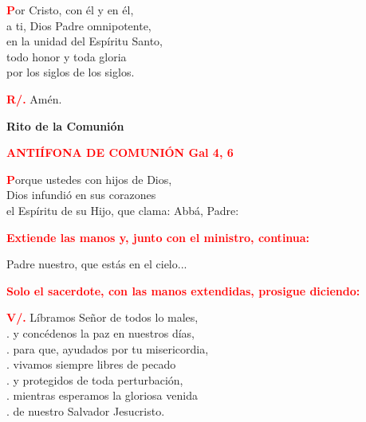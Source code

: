 \documentclass[12pt, letterpaper, spanish]{report}
\begin{document}
\lettrine[lines=1]{\bfseries \textcolor{red}{P}}{}or Cristo, con \'el y en \'el,\\
a ti, Dios Padre omnipotente,\\
en la unidad del Esp\'iritu Santo,\\
todo honor y toda gloria\\
por los siglos de los siglos.\newline

\Large \hspace{-0.9cm} {\bfseries \textcolor{red}{R/.}} \hspace{0.5cm} Am\'en.\newline

\begin{center}
\Huge {\bfseries Rito de la Comuni\'on}
\end{center}

\Large {\bfseries \textcolor{red}{ANTI\'IFONA DE COMUNI\'ON \hspace{2cm} \large Gal 4, 6}}

\Large \lettrine[lines=1]{\bfseries \textcolor{red}{P}}{}orque ustedes con hijos de Dios,\\
Dios infundi\'o en sus corazones\\
el Esp\'iritu de su Hijo, que clama: Abb\'a, Padre:\newline

\large{\bfseries \textcolor{red}{Extiende las manos y, junto con el ministro, continua:}}\newline

\Large Padre nuestro, que est\'as en el cielo...\newline

\large{\bfseries \textcolor{red}{Solo el sacerdote, con las manos extendidas, prosigue diciendo:}}\newline

\Large \hspace{-0.9cm} {\bfseries \textcolor{red}{V/.}} \hspace{0.5cm} L\'ibramos Se\~nor de todos lo males,\\
.\hspace{1.5cm} y conc\'edenos la paz en nuestros d\'ias,\\
.\hspace{1.5cm} para que, ayudados por tu misericordia,\\
.\hspace{1.5cm} vivamos siempre libres de pecado\\
.\hspace{1.5cm} y protegidos de toda perturbaci\'on,\\
.\hspace{1.5cm} mientras esperamos la gloriosa venida\\
.\hspace{1.5cm} de nuestro Salvador Jesucristo.\newline
\end{document}
